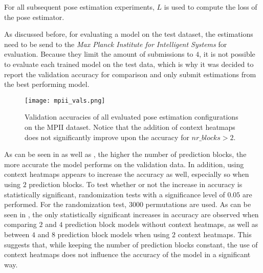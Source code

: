 For all subsequent pose estimation experiments, $L$ is used to compute the loss of the pose estimator.

As discussed before, for evaluating a model on the test dataset, the estimations need to be send to the \textit{Max Planck Institute for Intelligent Systems} for evaluation.
Because they limit the amount of submissions to $4$, it is not possible to evaluate each trained model on the test data, which is why it was decided to report the validation accuracy for comparison and only submit estimations from the best performing model.

\begin{figure}[htb!]
    \centering
    \texttt{[image: mpii\_vals.png]}
    \caption{Validation accuracies of all evaluated pose estimation configurations on the MPII dataset. Notice that the addition of context heatmaps does not significantly improve upon the accuracy for $nr\_blocks > 2$. }
    \label{fig:mpii_vals}
\end{figure}

As can be seen in  as well as , the higher the number of prediction blocks, the more accurate the model performs on the validation data.
In addition, using context heatmaps appears to increase the accuracy as well, especially so when using $2$ prediction blocks.
To test whether or not the increase in accuracy is statistically significant, randomization tests with a significance level of $0.05$ are performed.
For the randomization test, $3000$ permutations are used.
As can be seen in , the only statistically significant increases in accuracy are observed when comparing $2$ and $4$ prediction block models without context heatmaps, as well as between $4$ and $8$ prediction block models when using $2$ context heatmaps.
This suggests that, while keeping the number of prediction blocks constant, the use of context heatmaps does not influence the accuracy of the model in a significant way.

